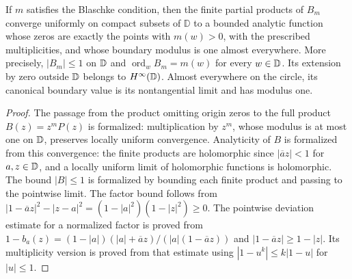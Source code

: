 \begin{theorem}
  \label{thm:II_2_2}
  \leanok
  \mainline
  If $m$ satisfies the Blaschke condition, then the finite partial products
  of $B_m$ converge uniformly on compact subsets of $\mathbb{D}$ to a bounded
  analytic function whose zeros are exactly the points with $m(w)>0$, with
  the prescribed multiplicities, and whose boundary modulus is one almost
  everywhere. More precisely, $|B_m|\le1$ on $\mathbb{D}$ and
  $\operatorname{ord}_w B_m=m(w)$ for every $w\in\mathbb{D}$.
  Its extension by zero outside $\mathbb{D}$ belongs to $H^\infty(\mathbb{D})$.
  Almost everywhere on the circle, its canonical boundary value is its
  nontangential limit and has modulus one.
  \begin{proof}
    \leanok
    The passage from the product omitting origin zeros to the full product
    $B(z)=z^mP(z)$ is formalized: multiplication by $z^m$, whose modulus
    is at most one on $\mathbb{D}$, preserves locally uniform convergence.
    Analyticity of $B$ is formalized from this convergence: the finite
    products are holomorphic since $|\overline{a}z|<1$ for $a,z\in\mathbb{D}$,
    and a locally uniform limit of holomorphic functions is holomorphic.
    The bound $|B|\le1$ is formalized by bounding each finite product
    and passing to the pointwise limit. The factor bound follows from
    $|1-\overline a z|^2-|z-a|^2=(1-|a|^2)(1-|z|^2)\ge0$.
    The pointwise deviation estimate for a normalized factor is proved from
    $1-b_a(z)=(1-|a|)(|a|+\overline a z)/(|a|(1-\overline a z))$ and
    $|1-\overline a z|\ge1-|z|$. Its multiplicity version is proved from that estimate
    using $|1-u^k|\le k|1-u|$ for $|u|\le1$.

\end{proof}
\end{theorem}
